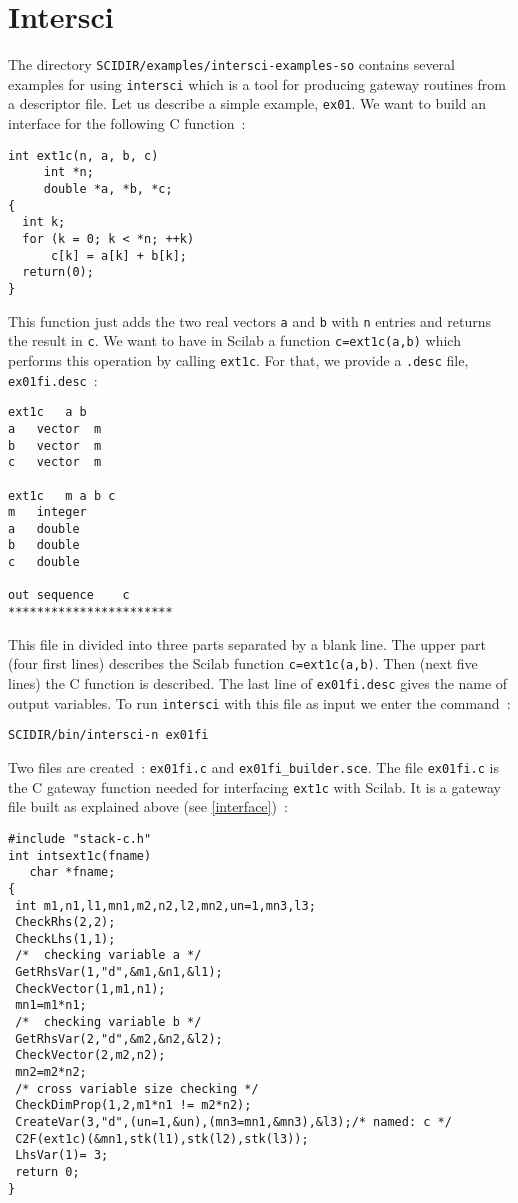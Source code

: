 \section{Intersci}
The directory \verb!SCIDIR/examples/intersci-examples-so! contains
several examples for using \verb!intersci! which is a tool for
producing gateway routines from a descriptor file.
Let us describe a simple example, \verb!ex01!.
We want to build an interface for the following C function~:
\begin{verbatim}
int ext1c(n, a, b, c)
     int *n;
     double *a, *b, *c;
{   
  int k;
  for (k = 0; k < *n; ++k) 
      c[k] = a[k] + b[k];
  return(0);
}
\end{verbatim}
This function just adds the two real vectors \verb!a! and \verb!b! 
with \verb!n! entries and returns the result in \verb!c!.
We want to have in Scilab a function \verb!c=ext1c(a,b)! which
performs this operation by calling  \verb!ext1c!.
For that, we provide a \verb!.desc! file, \verb!ex01fi.desc!~:
\begin{verbatim}
ext1c	a b 
a 	vector	m
b 	vector	m
c	vector  m 

ext1c   m a b c 
m	integer 
a	double 
b	double 
c	double 

out	sequence	c
***********************
\end{verbatim}
\noindent
This file in divided into three parts separated by a blank line. 
The upper part (four first lines) describes the Scilab function 
\verb!c=ext1c(a,b)!.
Then (next five lines) the C function is described. The last line of 
\verb!ex01fi.desc! gives the name of output variables. 
To run \verb!intersci! with this file as input we enter the command~:
\begin{verbatim}
SCIDIR/bin/intersci-n ex01fi
\end{verbatim}
Two files are created~: \verb!ex01fi.c! and \verb!ex01fi_builder.sce!.
The file \verb!ex01fi.c! is the C gateway function needed for interfacing
\verb!ext1c! with Scilab. It is a gateway file built as explained above 
(see \ref{interface})~:

\scriptsize
\begin{verbatim}
#include "stack-c.h"
int intsext1c(fname)
   char *fname;
{
 int m1,n1,l1,mn1,m2,n2,l2,mn2,un=1,mn3,l3;
 CheckRhs(2,2);
 CheckLhs(1,1);
 /*  checking variable a */
 GetRhsVar(1,"d",&m1,&n1,&l1);
 CheckVector(1,m1,n1);
 mn1=m1*n1;
 /*  checking variable b */
 GetRhsVar(2,"d",&m2,&n2,&l2);
 CheckVector(2,m2,n2);
 mn2=m2*n2;
 /* cross variable size checking */
 CheckDimProp(1,2,m1*n1 != m2*n2);
 CreateVar(3,"d",(un=1,&un),(mn3=mn1,&mn3),&l3);/* named: c */
 C2F(ext1c)(&mn1,stk(l1),stk(l2),stk(l3));
 LhsVar(1)= 3;
 return 0;
}
\end{verbatim}
\normalsize

